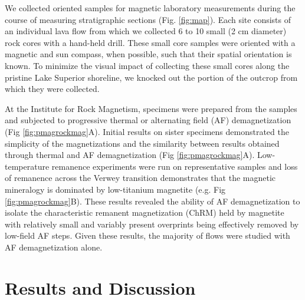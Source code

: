 \documentclass[draft,gc]{AGUTeX}
\begin{document}
\begin{article}
We collected oriented samples for magnetic laboratory measurements during the course of measuring stratigraphic sections (Fig. \ref{fig:map}). Each site consists of an individual lava flow from which we collected 6 to 10 small (2 cm diameter) rock cores with a hand-held drill. These small core samples were oriented with a magnetic and sun compass, when possible, such that their spatial orientation is known. To minimize the visual impact of collecting these small cores along the pristine Lake Superior shoreline, we knocked out the portion of the outcrop from which they were collected.

At the Institute for Rock Magnetism, specimens were prepared from the samples and subjected to progressive thermal or alternating field (AF) demagnetization (Fig \ref{fig:pmagrockmag}A). Initial results on sister specimens demonstrated the simplicity of the magnetizations and the similarity between results obtained through thermal and AF demagnetization (Fig \ref{fig:pmagrockmag}A). Low-temperature remanence experiments were run on representative samples and loss of remanence across the Verwey transition demonstrates that the magnetic mineralogy is dominated by low-titanium magnetite (e.g. Fig \ref{fig:pmagrockmag}B). These results revealed the ability of AF demagnetization to isolate the characteristic remanent magnetization (ChRM) held by magnetite with relatively small and variably present overprints being effectively removed by low-field AF steps. Given these results, the majority of flows were studied with AF demagnetization alone.


\section{Results and Discussion}


\end{article}
\end{document}
